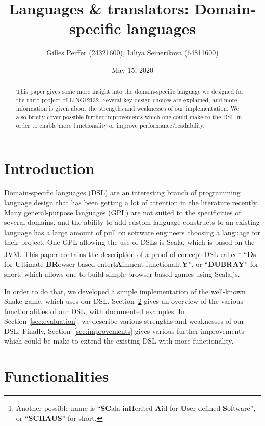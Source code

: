 \documentclass[journal,onecolumn]{IEEEtran}
\title{Languages \& translators: Domain-specific languages}
\author{Gilles Peiffer (24321600), Liliya Semerikova (64811600)}
\date{May 15, 2020}
\theoremstyle{definition}
\begin{document}
\maketitle

\begin{abstract}
	This paper gives some more insight into the domain-specific language we designed for the third project of LINGI2132.
	Several key design choices are explained, and more information is given about the strengths and weaknesses of our implementation.
	We also briefly cover possible further improvements which one could make to the DSL in order to enable more functionality or improve performance/readability.
\end{abstract}

\section{Introduction}
Domain-specific languages (DSL) are an interesting branch of programming language design that has been getting a lot of attention in the literature recently.
Many general-purpose languages (GPL) are not suited to the specificities of several domains, and the ability to add custom language constructs to an existing language has a large amount of pull on software engineers choosing a language for their project.
One GPL allowing the use of DSLs is Scala, which is based on the JVM.
This paper contains the description of a proof-of-concept DSL called\footnote{Another possible name is ``\textbf{SC}ala-in\textbf{H}erited \textbf{A}id for \textbf{U}ser-defined \textbf{S}oftware'', or ``\textbf{SCHAUS}'' for short.} ``\textbf{D}sl for \textbf{U}ltimate \textbf{BR}owser-based entert\textbf{A}inment functionalit\textbf{Y}'', or ``\textbf{DUBRAY}'' for short, which allows one to build simple browser-based games using Scala.js.

In order to do that, we developed a simple implementation of the well-known Snake game, which uses our DSL.
Section~\ref{sec:functionalities} gives an overview of the various functionalities of our DSL, with documented examples.
In Section~\ref{sec:evaluation}, we describe various strengths and weaknesses of our DSL.
Finally, Section~\ref{sec:improvements} gives various further improvements which could be make to extend the existing DSL with more functionality.

\section{Functionalities}
\label{sec:functionalities}
\end{document}
